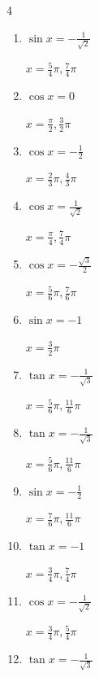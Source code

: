 \begin{multicols}{4}
\begin{enumerate}
  \item $\displaystyle \sin{x}  = -\frac{1}{\sqrt{2}}$

        $\displaystyle x = \frac{5}{4}\pi , \frac{7}{4}\pi$

  \item $\displaystyle \cos{x}  = 0$

        $\displaystyle x = \frac{\pi}{2} , \frac{3}{2}\pi$

  \item $\displaystyle \cos{x}  = -\frac{1}{2}$

        $\displaystyle x = \frac{2}{3}\pi , \frac{4}{3}\pi$

  \item $\displaystyle \cos{x}  = \frac{1}{\sqrt{2}}$

        $\displaystyle x = \frac{\pi}{4} , \frac{7}{4}\pi$

  \item $\displaystyle \cos{x}  = -\frac{\sqrt{3}}{2}$

        $\displaystyle x = \frac{5}{6}\pi , \frac{7}{6}\pi$

\columnbreak %

  \item $\displaystyle \sin{x}  = -1$

        $\displaystyle x = \frac{3}{2}\pi$

  \item $\displaystyle \tan{x}  = -\frac{1}{\sqrt{3}}$

        $\displaystyle x = \frac{5}{6}\pi , \frac{11}{6}\pi$

  \item $\displaystyle \tan{x}  = -\frac{1}{\sqrt{3}}$

        $\displaystyle x = \frac{5}{6}\pi , \frac{11}{6}\pi$

  \item $\displaystyle \sin{x}  = -\frac{1}{2}$

        $\displaystyle x = \frac{7}{6}\pi , \frac{11}{6}\pi$

  \item $\displaystyle \tan{x}  = -1$

        $\displaystyle x = \frac{3}{4}\pi , \frac{7}{4}\pi$

  \item $\displaystyle \cos{x}  = -\frac{1}{\sqrt{2}}$

        $\displaystyle x = \frac{3}{4}\pi , \frac{5}{4}\pi$

  \item $\displaystyle \tan{x}  = -\frac{1}{\sqrt{3}}$


\end{enumerate}
\end{multicols}
